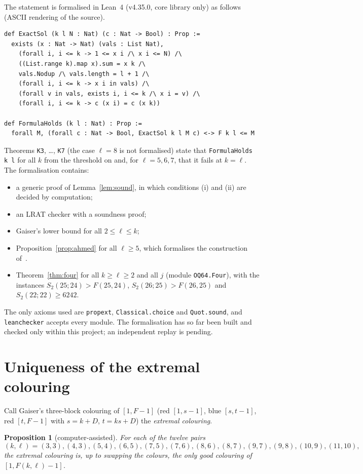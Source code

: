 \documentclass[11pt]{amsart}
\newtheorem{proposition}[theorem]{Proposition}
\theoremstyle{definition}
\newcommand{\F}{F}
\newcommand{\Stwo}{S_2}
\begin{document}
The statement is formalised in Lean~4 (v4.35.0, core library only) as follows (ASCII rendering of the source).
\begin{verbatim}
def ExactSol (k l N : Nat) (c : Nat -> Bool) : Prop :=
  exists (x : Nat -> Nat) (vals : List Nat),
    (forall i, i <= k -> 1 <= x i /\ x i <= N) /\
    ((List.range k).map x).sum = x k /\
    vals.Nodup /\ vals.length = l + 1 /\
    (forall i, i <= k -> x i in vals) /\
    (forall v in vals, exists i, i <= k /\ x i = v) /\
    (forall i, i <= k -> c (x i) = c (x k))

def FormulaHolds (k l : Nat) : Prop :=
  forall M, (forall c : Nat -> Bool, ExactSol k l M c) <-> F k l <= M
\end{verbatim}
Theorems \texttt{K3}, \dots, \texttt{K7} (the case $\ell=8$ is not formalised) state that \texttt{FormulaHolds k l} for all $k$ from the threshold on and, for $\ell=5,6,7$, that it fails at $k=\ell$. The formalisation contains:
\begin{itemize}
\item a generic proof of Lemma~\ref{lem:sound}, in which conditions (i) and (ii) are decided by computation;
\item an LRAT checker with a soundness proof;
\item Gaiser's lower bound for all $2\le\ell\le k$;
\item Proposition~\ref{prop:ahmed} for all $\ell\ge5$, which formalises the construction of~\cite{ABRS}.
\item Theorem~\ref{thm:four} for all $k\ge\ell\ge2$ and all $j$ (module \texttt{OQ64.Four}), with the instances $\Stwo(25;24)>\F(25,24)$, $\Stwo(26;25)>\F(26,25)$ and $\Stwo(22;22)\ge6242$.
\end{itemize}
The only axioms used are \texttt{propext}, \texttt{Classical.choice} and \texttt{Quot.sound}, and \texttt{leanchecker} accepts every module. The formalisation has so far been built and checked only within this project; an independent replay is pending.

\section{Uniqueness of the extremal colouring}\label{sec:unique}

Call Gaiser's three-block colouring of $[1,\F-1]$ (red $[1,s-1]$, blue $[s,t-1]$, red $[t,\F-1]$ with $s=k+D$, $t=ks+D$) the \emph{extremal colouring}.

\begin{proposition}[computer-assisted]\label{prop:unique}
For each of the twelve pairs
\[(k,\ell)=(3,3),(4,3),(5,4),(6,5),(7,5),(7,6),(8,6),(8,7),(9,7),(9,8),(10,9),(11,10),\]
the extremal colouring is, up to swapping the colours, the only good colouring of $[1,\F(k,\ell)-1]$.
\end{proposition}
\end{document}
